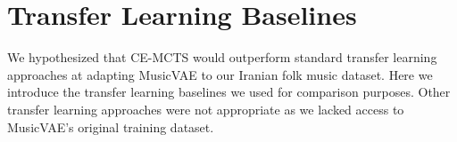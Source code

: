 \documentclass[letterpaper]{article}
\begin{document}

\section{Transfer Learning Baselines} \label{tlmethod}

We hypothesized that CE-MCTS would outperform standard transfer learning approaches at adapting MusicVAE to our Iranian folk music dataset. Here we introduce the transfer learning baselines we used for comparison purposes. Other transfer learning approaches were not appropriate as we lacked access to MusicVAE's original training dataset.
\end{document}
